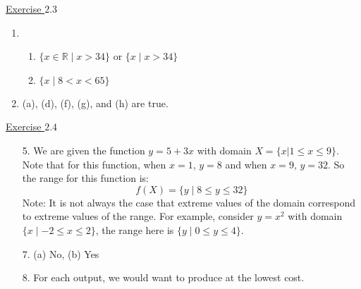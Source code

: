 \documentclass{./../../Latex/handout}
\begin{document}
\thispagestyle{plain}

\underline{Exercise $2.3$} 

\begin{enumerate}
\item \begin{enumerate}
	\item $ \{x \in \mathbb{R} \mid x>34\}$ or  $\{x \mid x>34\} $
	\item $\{x \mid 8<x<65\}$ 
\end{enumerate}
\item (a), (d), (f), (g), and (h) are true. 
\end{enumerate}

\underline{Exercise $2.4$} 

\begin{enumerate}
\item[5.] We are given the function $y=5+3x$ with domain $X = \{x | 1 \leq x \leq 9 \}$. Note that for this function, when $x=1$, $y=8$ and when $x=9$, $y=32$. So the range for this function is:
$$
f(X) =\{y \mid 8 \leq y \leq 32\}
$$
Note: It is not always the case that extreme values of the domain correspond to extreme values of the range. For example, consider $y=x^{2}$ with domain $\{x \mid-2 \leq x \leq 2\}$, the range here is $\{y \mid 0 \leq y \leq 4\}$.

\item[7.] (a) No, (b) Yes
\item[8.] For each output, we would want to produce at the lowest cost. \\
\end{enumerate}
\end{document}
